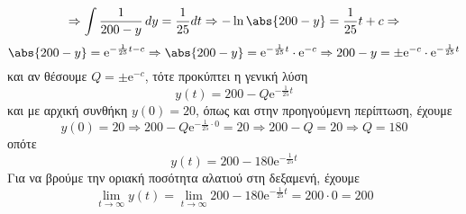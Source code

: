 \begin{solution}
\begin{enumerate}[i)]
\[        \Rightarrow \int \frac{1}{200-y} \,{dy} = \frac{1}{25} dt \Rightarrow 
        -\ln{\abs{200-y}} = \frac{1}{25} t + c \Rightarrow 
      \] 
      \[
        \abs{200-y} = \mathrm{e}^{-\frac{1}{25} t - c} 
        \Rightarrow \abs{200-y} = \mathrm{e}^{-\frac{1}{25} t} \cdot \mathrm{e}^{-c} 
        \Rightarrow 200-y = \pm \mathrm{e}^{-c} \cdot \mathrm{e}^{-\frac{1}{25} t}
      \] 
      και αν θέσουμε $ Q = \pm \mathrm{e}^{-c} $, τότε προκύπτει η γενική λύση 
      \[
        y(t) = 200 - Q \mathrm{e}^{-\frac{1}{25} t} 
      \] 
      και με αρχική συνθήκη $ y(0)=20 $, όπως και στην προηγούμενη περίπτωση, έχουμε 
      \[
        y(0)=20 \Rightarrow 200-Q \mathrm{e}^{-\frac{1}{25} \cdot 0} = 20 \Rightarrow 
        200 - Q = 20 \Rightarrow Q = 180
      \]
      οπότε
      \[
        y(t) = 200 - 180 \mathrm{e}^{-\frac{1}{25} t} 
      \]
      Για να βρούμε την οριακή ποσότητα αλατιού στη δεξαμενή, έχουμε
      \[
        \lim_{t \to \infty} y(t) = \lim_{t \to \infty} 200 -180 
        \mathrm{e}^{-\frac{1}{25} t} = 200 \cdot 0 = 200 
      \]
  \end{enumerate}
\end{solution}




